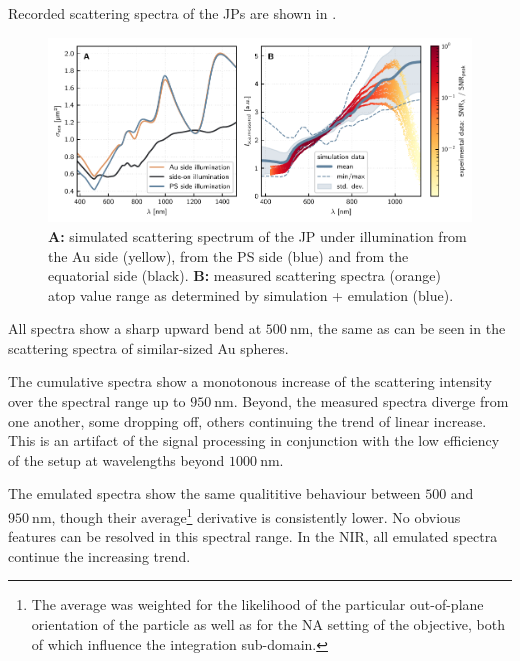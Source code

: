 \documentclass[10pt]{article}
\newcommand{\reffig}[2]{\mbox{\sffamily{Figure \ref{#1}#2}}}
\begin{document}
Recorded scattering spectra of the JPs are shown in \reffig{fig:spectra}{B}.

\begin{figure}[t]
    \centering
    \includegraphics{[fig] spectra.PDF}
    \caption{{\sffamily\bfseries A:} simulated scattering spectrum of the JP under illumination from the Au side (yellow), from the PS side (blue) and from the equatorial side (black). {\sffamily\bfseries B:} measured scattering spectra (orange) atop value range as determined by simulation + emulation (blue).}
    \label{fig:spectra}
\end{figure}


All spectra show a sharp upward bend at $\SI{500}{\nano\meter}$, the same as can be seen in the scattering spectra of similar-sized Au spheres. 

The cumulative spectra show a monotonous increase of the scattering intensity over the spectral range up to $\SI{950}{\nano\meter}$. 
Beyond, the measured spectra diverge from one another, some dropping off, others continuing the trend of linear increase.  
This is an artifact of the signal processing in conjunction with the low efficiency of the setup at wavelengths beyond $\SI{1000}{\nano\meter}$. 


The emulated spectra show the same qualititive behaviour between $500$ and $\SI{950}{\nano\meter}$, though their average\footnote{The average was weighted for the likelihood of the particular out-of-plane orientation of the particle as well as for the NA setting of the objective, both of which influence the integration sub-domain.} derivative is consistently  lower. 
No obvious features can be resolved in this spectral range. 
In the NIR, all emulated spectra continue the increasing trend. 
\end{document}
